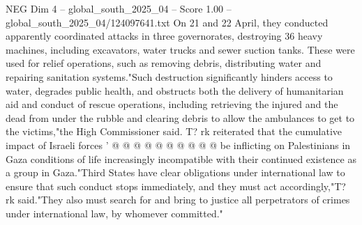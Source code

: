 \begin{textsample}{NEG Dim 4 – global\_south\_2025\_04 – Score 1.00 – global\_south\_2025\_04/124097641.txt}
On 21 and 22 April, they conducted apparently coordinated attacks in three governorates, destroying 36 heavy machines, including excavators, water trucks and sewer suction tanks.
These were used for relief operations, such as removing debris, distributing water and repairing sanitation systems."Such destruction significantly hinders access to water, degrades public health, and obstructs both the delivery of humanitarian aid and conduct of rescue operations, including retrieving the injured and the dead from under the rubble and clearing debris to allow the ambulances to get to the victims,"the High Commissioner said.
T? rk reiterated that the cumulative impact of Israeli forces ' @ @ @ @ @ @ @ @ @ @ be inflicting on Palestinians in Gaza conditions of life increasingly incompatible with their continued existence as a group in Gaza."Third States have clear obligations under international law to ensure that such conduct stops immediately, and they must act accordingly,"T? rk said."They also must search for and bring to justice all perpetrators of crimes under international law, by whomever committed."

\end{textsample}
